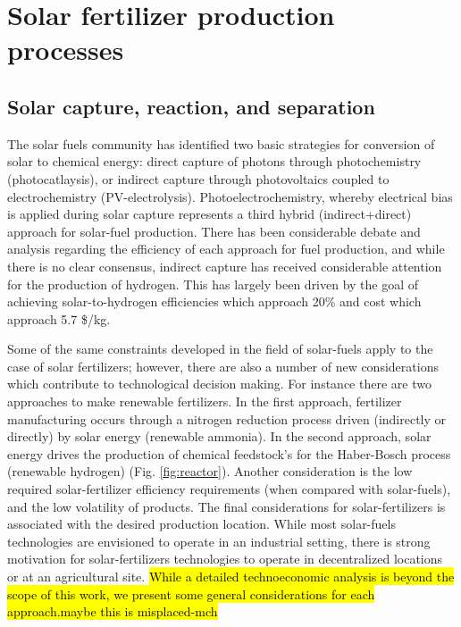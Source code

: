 \section{Solar fertilizer production processes}
\label{sec:approaches}

\subsection{Solar capture, reaction, and separation}


The solar fuels community has identified two basic strategies for conversion of solar to chemical energy: direct capture of photons through photochemistry (photocatlaysis), or indirect capture through photovoltaics coupled to electrochemistry (PV-electrolysis)\cite{McDaniel_2010,Highfield_2015}. Photoelectrochemistry, whereby electrical bias is applied during solar capture represents a third hybrid (indirect+direct) approach for solar-fuel production. There has been considerable debate and analysis regarding the efficiency of each approach for fuel production\cite{Montoya_2017,Daviseaas9793,Lewis_2016,Herron_2015}, and while there is no clear consensus, indirect capture has received considerable attention for the production of hydrogen. This has largely been driven by the goal of achieving solar-to-hydrogen efficiencies which approach 20\% and cost which approach 5.7 \$/kg. 

Some of the same constraints developed in the field of solar-fuels apply to the case of solar fertilizers; however, there are also a number of new considerations which contribute to technological decision making. For instance there are two approaches to make renewable fertilizers. In the first approach, fertilizer manufacturing occurs through a nitrogen reduction process driven (indirectly or directly) by solar energy (renewable ammonia). In the second approach, solar energy drives the production of chemical feedstock’s for the Haber-Bosch process (renewable hydrogen)  (Fig. \ref{fig:reactor}). Another consideration is the low required solar-fertilizer efficiency requirements (when compared with solar-fuels), and the low volatility of products. The final considerations for solar-fertilizers is associated with the desired production location.  While most solar-fuels technologies are envisioned to operate in an industrial setting, there is strong motivation for solar-fertilizers technologies to operate in decentralized locations or at an agricultural site. \hl{While a detailed technoeconomic analysis is beyond the scope of this work, we present some general considerations for each approach.maybe this is misplaced-mch}

